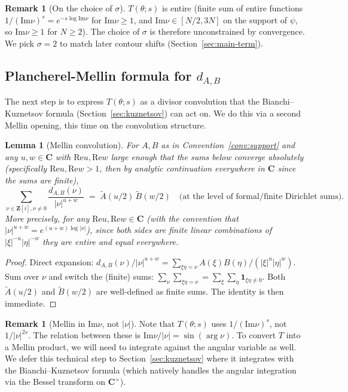 \documentclass[11pt]{article}
\newtheorem{lemma}[theorem]{Lemma}
\theoremstyle{definition}
\newtheorem{remark}[theorem]{Remark}
\newcommand{\Z}{\mathbf{Z}}
\newcommand{\C}{\mathbf{C}}
\newcommand{\Zi}{\Z[i]}
\renewcommand{\Re}{\mathrm{Re}}
\renewcommand{\Im}{\mathrm{Im}}
\begin{document}
\begin{remark}[On the choice of $\sigma$]\label{rem:sigma}
$T(\theta;s)$ is entire (finite sum of entire functions $1/(\Im\nu)^s = e^{-s\log\Im\nu}$ for $\Im\nu\ge 1$, and $\Im\nu\in[N/2,3N]$ on the support of $\psi$, so $\Im\nu\ge 1$ for $N\ge 2$). The choice of $\sigma$ is therefore unconstrained by convergence. We pick $\sigma=2$ to match later contour shifts (Section~\ref{sec:main-term}).
\end{remark}

\subsection{Plancherel-Mellin formula for $d_{A,B}$}\label{ssec:plancherel-mellin}

The next step is to express $T(\theta;s)$ as a divisor convolution that the Bianchi--Kuznetsov formula (Section~\ref{sec:kuznetsov}) can act on. We do this via a second Mellin opening, this time on the convolution structure.

\begin{lemma}[Mellin convolution]\label{lem:mellin-convolution}
For $A,B$ as in Convention~\ref{conv:support} and any $u,w\in\C$ with $\Re u,\Re w$ large enough that the sums below converge absolutely (specifically $\Re u,\Re w>1$, then by analytic continuation everywhere in $\C$ since the sums are finite),
\[
   \sum_{\nu\in\Zi,\nu\ne 0}\frac{d_{A,B}(\nu)}{|\nu|^{u+w}}\;=\;\widetilde A(u/2)\,\widetilde B(w/2)\quad\text{(at the level of formal/finite Dirichlet sums)}.
\]
More precisely, for any $\Re u,\Re w\in\C$ (with the convention that $|\nu|^{u+w}=e^{(u+w)\log|\nu|}$), since both sides are finite linear combinations of $|\xi|^{-u}|\eta|^{-w}$ they are entire and equal everywhere.
\end{lemma}

\begin{proof}
Direct expansion: $d_{A,B}(\nu)/|\nu|^{u+w}=\sum_{\xi\eta=\nu}A(\xi)B(\eta)/(|\xi|^u|\eta|^w)$. Sum over $\nu$ and switch the (finite) sums: $\sum_\nu\sum_{\xi\eta=\nu}=\sum_\xi\sum_\eta\mathbf 1_{\xi\eta\ne 0}$. Both $\widetilde A(u/2)$ and $\widetilde B(w/2)$ are well-defined as finite sums. The identity is then immediate.
\end{proof}

\begin{remark}[Mellin in $\Im\nu$, not $|\nu|$]\label{rem:mellin-direction}
Note that $T(\theta;s)$ uses $1/(\Im\nu)^s$, not $1/|\nu|^{2s}$. The relation between these is $\Im\nu/|\nu|=\sin(\arg\nu)$. To convert $T$ into a Mellin product, we will need to integrate against the angular variable as well. We defer this technical step to Section~\ref{sec:kuznetsov} where it integrates with the Bianchi--Kuznetsov formula (which natively handles the angular integration via the Bessel transform on $\C^\times$).
\end{remark}
\end{document}

